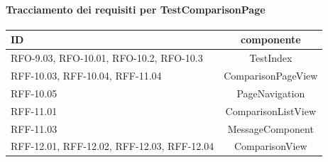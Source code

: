 \paragraph{Tracciamento dei requisiti per TestComparisonPage}
\begin{tabularx}{\textwidth}{|X|c|}
    \hline
    \textbf{ID} & \textbf{componente} \\
    \hline
        RFO-9.03, RFO-10.01, RFO-10.2, RFO-10.3 & TestIndex \\
    \hline
        RFF-10.03, RFF-10.04, RFF-11.04 & ComparisonPageView\\
    \hline
        RFF-10.05 & PageNavigation \\
    \hline 
        RFF-11.01 & ComparisonListView \\
    \hline
        RFF-11.03 & MessageComponent \\
    \hline
        RFF-12.01, RFF-12.02, RFF-12.03, RFF-12.04 & ComparisonView \\
    \hline 
\end{tabularx}